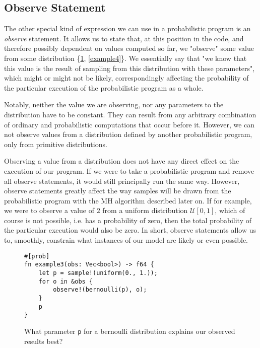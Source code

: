 \subsection{Observe Statement}

The other special kind of expression we can use in a probabilistic program is an \textit{observe} statement. It allows us to state that, at this position in the code, and therefore possibly dependent on values computed so far, we "observe" some value from some distribution \{\ref{example3}, \ref{example4}\}. We essentially say that "we know that this value is the result of sampling from this distribution with these parameters", which might or might not be likely, correspondingly affecting the probability of the particular execution of the probabilistic program as a whole. 

Notably, neither the value we are observing, nor any parameters to the distribution have to be constant. They can result from any arbitrary combination of ordinary and probabilistic computations that occur before it. However, we can not observe values from a distribution defined by another probabilistic program, only from primitive distributions.

Observing a value from a distribution does not have any direct effect on the execution of our program. If we were to take a probabilistic program and remove all observe statements, it would still principally run the same way. However, observe statements greatly affect the way samples will be drawn from the probabilistic program with the MH algorithm described later on. If for example, we were to observe a value of $2$ from a uniform distribution $\mathcal{U}[0,1]$, which of course is not possible, i.e. has a probability of zero, then the total probability of the particular execution would also be zero. In short, observe statements allow us to, smoothly, constrain what instances of our model are likely or even possible.

\begin{figure}[h]
\begin{lstlisting}
#[prob]
fn example3(obs: Vec<bool>) -> f64 {
    let p = sample!(uniform(0., 1.));
    for o in &obs {
        observe!(bernoulli(p), o);
    }
    p
}
\end{lstlisting}
\caption{What parameter \lstinline{p} for a bernoulli distribution explains our observed results best?}
\label{example3}
\end{figure}

